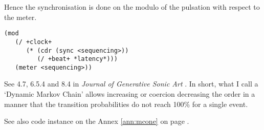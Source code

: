 Hence the synchronisation is done on the modulo of the pulsation with respect to the meter.
\begin{lstlisting}[language=N3]
(mod 
   (/ +clock+ 
      (* (cdr (sync <sequencing>)) 
         (/ +beat+ *latency*))) 
   (meter <sequencing>))   
\end{lstlisting}

\bigskip
\bigskip


\bigskip

See  4.7, 6.5.4 and 8.4 in \textsl{Journal of Generative Sonic Art} \citep{yi}. In short, what I call a `Dynamic Markov Chain' allows increasing or coercion decreasing the order in a manner that the transition probabilities do not reach 100\% for a single event.
 
See also code instance on the Annex \ref{ann:mcone} on page \pageref{ann:mcone}.

%
%

